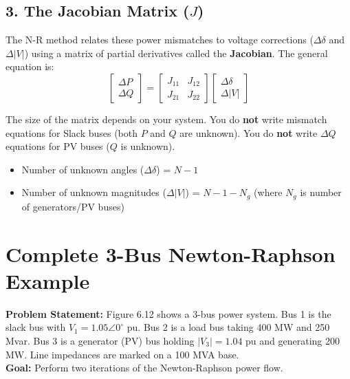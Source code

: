\documentclass[11pt]{article}
\begin{document}
\subsection*{3. The Jacobian Matrix ($J$)}
The N-R method relates these power mismatches to voltage corrections ($\Delta \delta$ and $\Delta |V|$) using a matrix of partial derivatives called the \textbf{Jacobian}. The general equation is:
\begin{equation*}
    \begin{bmatrix} \Delta P \\ \Delta Q \end{bmatrix} = 
    \begin{bmatrix} J_{11} & J_{12} \\ J_{21} & J_{22} \end{bmatrix} 
    \begin{bmatrix} \Delta \delta \\ \Delta |V| \end{bmatrix}
\end{equation*}

\begin{conceptbox}
The size of the matrix depends on your system. You do \textbf{not} write mismatch equations for Slack buses (both $P$ and $Q$ are unknown). You do \textbf{not} write $\Delta Q$ equations for PV buses ($Q$ is unknown).
\begin{itemize}
    \item Number of unknown angles ($\Delta \delta$) = $N - 1$
    \item Number of unknown magnitudes ($\Delta |V|$) = $N - 1 - N_g$ (where $N_g$ is number of generators/PV buses)
\end{itemize}
\end{conceptbox}

\newpage
\section*{\textcolor{mainblue}{Complete 3-Bus Newton-Raphson Example}}

\textbf{Problem Statement:} 
Figure 6.12 shows a 3-bus power system. Bus 1 is the slack bus with $V_1 = 1.05 \angle 0^\circ$ pu. Bus 2 is a load bus taking 400 MW and 250 Mvar. Bus 3 is a generator (PV) bus holding $|V_3| = 1.04$ pu and generating 200 MW. Line impedances are marked on a 100 MVA base. \\
\textbf{Goal:} Perform two iterations of the Newton-Raphson power flow.
\end{document}
